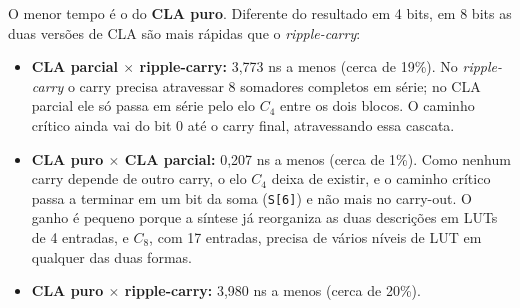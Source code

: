 \documentclass[report, 12pt]{uftreport}
\begin{document}
O menor tempo é o do \textbf{CLA puro}. Diferente do resultado em 4 bits, em 8 bits as duas versões de CLA são mais rápidas que o \textit{ripple-carry}:

\begin{itemize}
  \item \textbf{CLA parcial $\times$ ripple-carry:} 3{,}773 ns a menos (cerca de 19\%). No \textit{ripple-carry} o carry precisa atravessar 8 somadores completos em série; no CLA parcial ele só passa em série pelo elo $C_4$ entre os dois blocos. O caminho crítico ainda vai do bit 0 até o carry final, atravessando essa cascata.
  \item \textbf{CLA puro $\times$ CLA parcial:} 0{,}207 ns a menos (cerca de 1\%). Como nenhum carry depende de outro carry, o elo $C_4$ deixa de existir, e o caminho crítico passa a terminar em um bit da soma (\texttt{S[6]}) e não mais no carry-out. O ganho é pequeno porque a síntese já reorganiza as duas descrições em LUTs de 4 entradas, e $C_8$, com 17 entradas, precisa de vários níveis de LUT em qualquer das duas formas.
  \item \textbf{CLA puro $\times$ ripple-carry:} 3{,}980 ns a menos (cerca de 20\%).
\end{itemize}

\backmatter
\end{document}
